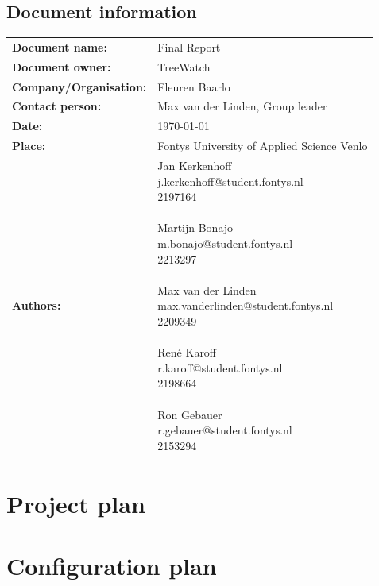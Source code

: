 \documentclass[12pt]{report}
\newcommand{\addPart}[1]
{
  \clearpage
  \setlength{\voffset}{0cm}
  \setlength{\hoffset}{0cm}

  

  \setmarginsrb{3 cm}{2.5 cm}{3 cm}{2.5 cm}{1 cm}{1.5 cm}{1 cm}{1.5 cm}
}
\begin{document}
  \section*{Document information}
	\begin{tabular}{ll}
		\textbf{Document name:} & Final Report\\
		\textbf{Document owner:} & TreeWatch \\
		\textbf{Company/Organisation:} & Fleuren Baarlo \\
		\textbf{Contact person:} & Max van der Linden, Group leader \\
		\textbf{Date:} & \today \\
		\textbf{Place:} & Fontys University of Applied Science Venlo \\
		\textbf{Authors:} & \parbox[t]{5cm}{
		Jan Kerkenhoff\\ j.kerkenhoff@student.fontys.nl\\ 2197164 \\ \\
		Martijn Bonajo\\ m.bonajo@student.fontys.nl\\ 2213297 \\ \\
		Max van der Linden\\ max.vanderlinden@student.fontys.nl\\ 2209349 \\ \\
		René Karoff\\ r.karoff@student.fontys.nl\\ 2198664 \\ \\
		Ron Gebauer\\ r.gebauer@student.fontys.nl\\ 2153294 \\ }
	\end{tabular}


  \tableofcontents
  
  \chapter{Project plan}
  \addPart{parts/ProjectPlan.pdf}

  \chapter{Configuration plan}
  \addPart{parts/configurationplan/configurationplan.pdf}
\end{document}
